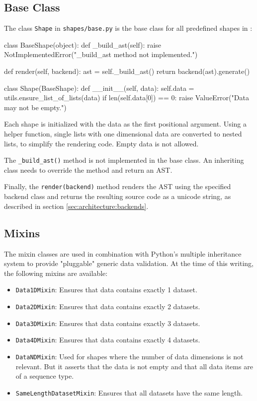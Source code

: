 \subsection{Base Class}

The class \texttt{Shape} in \texttt{shapes/base.py} is the base class for all
predefined shapes in \tangible{}:

\vspace{.5\baselineskip}

\begin{pythoncode}
class BaseShape(object):
    def _build_ast(self):
        raise NotImplementedError("_build_ast method not implemented.")

    def render(self, backend):
        ast = self._build_ast()
        return backend(ast).generate()
    
class Shape(BaseShape):
    def __init__(self, data):
        self.data = utils.ensure_list_of_lists(data)
        if len(self.data[0]) == 0:
            raise ValueError("Data may not be empty.")
\end{pythoncode}

\noindent Each shape is initialized with the data as the first positional
argument. Using a helper function, single lists with one dimensional data are
converted to nested lists, to simplify the rendering code. Empty data is not
allowed.

The \texttt{\_build\_ast()} method is not implemented in the base class. An
inheriting class needs to override the method and return an AST.

Finally, the \texttt{render(backend)} method renders the AST using the specified
backend class and returns the resulting source code as a unicode string, as
described in section \ref{sec:architecture:backends}.

\subsection{Mixins}

The mixin classes are used in combination with Python's multiple inheritance
system to provide "pluggable" generic data validation. At the time of this
writing, the following mixins are available:

\begin{itemize}
	\item \texttt{Data1DMixin}: Ensures that data contains exactly 1 dataset.
	\item \texttt{Data2DMixin}: Ensures that data contains exactly 2 datasets.
	\item \texttt{Data3DMixin}: Ensures that data contains exactly 3 datasets.
	\item \texttt{Data4DMixin}: Ensures that data contains exactly 4 datasets.
	\item \texttt{DataNDMixin}: Used for shapes where the number of data
		dimensions is not relevant. But it asserts that the data is not empty and
		that all data items are of a sequence type.
	\item \texttt{SameLengthDatasetMixin}: Ensures that all datasets have the same
		length.
\end{itemize}

